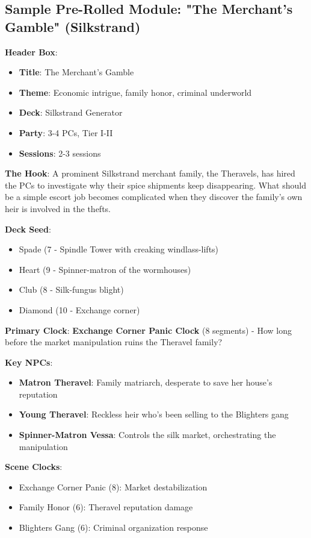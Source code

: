 \documentclass[11pt]{article}
\begin{document}
\subsection*{Sample Pre-Rolled Module: "The Merchant's Gamble" (Silkstrand)}

\begin{mdframed}[backgroundcolor=modulebg]
\textbf{Header Box}:
\begin{itemize}[leftmargin=*]
\item \textbf{Title}: The Merchant's Gamble
\item \textbf{Theme}: Economic intrigue, family honor, criminal underworld
\item \textbf{Deck}: Silkstrand Generator
\item \textbf{Party}: 3-4 PCs, Tier I-II
\item \textbf{Sessions}: 2-3 sessions
\end{itemize}

\textbf{The Hook}: A prominent Silkstrand merchant family, the Theravels, has hired the PCs to investigate why their spice shipments keep disappearing. What should be a simple escort job becomes complicated when they discover the family's own heir is involved in the thefts.

\textbf{Deck Seed}: 
\begin{itemize}[leftmargin=*]
\item Spade (7 - Spindle Tower with creaking windlass-lifts)
\item Heart (9 - Spinner-matron of the wormhouses)
\item Club (8 - Silk-fungus blight)
\item Diamond (10 - Exchange corner)
\end{itemize}

\textbf{Primary Clock}: \textbf{Exchange Corner Panic Clock} (8 segments) - How long before the market manipulation ruins the Theravel family?

\textbf{Key NPCs}:
\begin{itemize}[leftmargin=*]
\item \textbf{Matron Theravel}: Family matriarch, desperate to save her house's reputation
\item \textbf{Young Theravel}: Reckless heir who's been selling to the Blighters gang
\item \textbf{Spinner-Matron Vessa}: Controls the silk market, orchestrating the manipulation
\end{itemize}

\textbf{Scene Clocks}:
\begin{itemize}[leftmargin=*]
\item Exchange Corner Panic (8): Market destabilization
\item Family Honor (6): Theravel reputation damage  
\item Blighters Gang (6): Criminal organization response
\end{itemize}


\end{mdframed}
\end{document}
